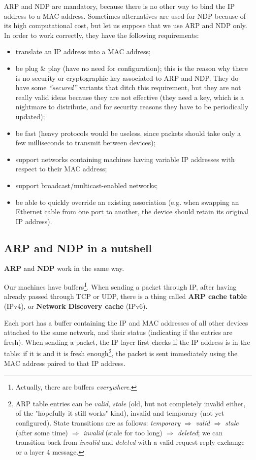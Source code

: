ARP and NDP are mandatory, because there is no other way to bind the IP address to a MAC address. Sometimes alternatives are used for NDP because of its high computational cost, but let us suppose that we use ARP and NDP only. In order to work correctly, they have the following requirements:

\begin{itemize}
	\item translate an IP address into a MAC address;
\item be plug \& play (have no need for configuration); this is the reason why there is no security or cryptographic key associated to ARP and NDP. They do have some \textit{“secured”} variants that ditch this requirement, but they are not really valid ideas because they are not effective (they need a key, which is a nightmare to distribute, and for security reasons they have to be periodically updated);
\item be fast (heavy protocols would be useless, since packets should take only a few milliseconds to transmit between devices);
\item support networks containing machines having variable IP addresses with respect to their MAC address;
\item support broadcast/multicast-enabled networks;
\item be able to quickly override an existing association (e.g. when swapping an Ethernet cable from one port to another, the device should retain its original IP address).
\end{itemize}


\subsection{ARP and NDP in a nutshell}
\textbf{ARP} and \textbf{NDP} work in the same way.

Our machines have buffers\footnote{Actually, there are buffers \textit{everywhere}.}. When sending a packet through IP, after having already passed through TCP or UDP, there is a thing called \textbf{ARP cache table} (IPv4), or \textbf{Network Discovery cache} (IPv6).

Each port has a buffer containing the IP and MAC addresses of all other devices attached to the same network, and their status (indicating if the entries are fresh). When sending a packet, the IP layer first checks if the IP address is in the table: if it is and it is fresh enough\footnote{ARP table entries can be \textit{valid}, \textit{stale} (old, but not completely invalid either, of the "hopefully it still works" kind), invalid and temporary (not yet configured). State transitions are as follows: \textit{temporary} $\Rightarrow$ \textit{valid} $\Rightarrow$ \textit{stale} (after some time) $\Rightarrow $ \textit{invalid} (stale for too long) $\Rightarrow $ \textit{deleted}; we can transition back from \textit{invalid} and \textit{deleted} with a valid request-reply exchange or a layer 4 message.}, the packet is sent immediately using the MAC address paired to that IP address.
 
